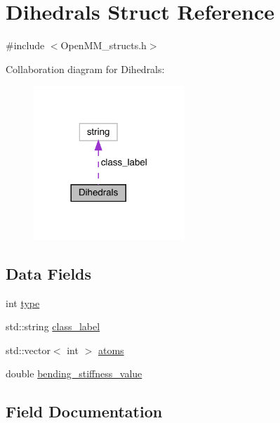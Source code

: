 \hypertarget{structDihedrals}{}\section{Dihedrals Struct Reference}
\label{structDihedrals}


{\ttfamily \#include $<$Open\+M\+M\+\_\+structs.\+h$>$}



Collaboration diagram for Dihedrals\+:
\nopagebreak
\begin{figure}[H]
\begin{center}
\leavevmode
\includegraphics[width=161pt]{structDihedrals__coll__graph}
\end{center}
\end{figure}
\subsection*{Data Fields}
\begin{DoxyCompactItemize}
\item 
int \mbox{\hyperlink{structDihedrals_aec015ae7812fd13d61a9ff90645c104b}{type}}
\item 
std\+::string \mbox{\hyperlink{structDihedrals_a43e78eca1517f607d420ddc3387adc42}{class\+\_\+label}}
\item 
std\+::vector$<$ int $>$ \mbox{\hyperlink{structDihedrals_a725d2759bee181eede7152172a55ca9f}{atoms}}
\item 
double \mbox{\hyperlink{structDihedrals_aadecae129e161803f43e86d153466b61}{bending\+\_\+stiffness\+\_\+value}}
\end{DoxyCompactItemize}


\subsection{Field Documentation}
\mbox{\label{structDihedrals_a725d2759bee181eede7152172a55ca9f}} 
